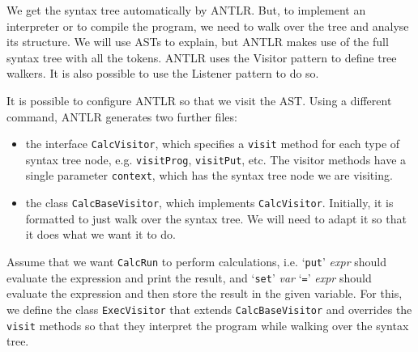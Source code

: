 \documentclass[a4paper, openany]{memoir}
\begin{document}
We get the syntax tree automatically by ANTLR. But, to implement an interpreter or to compile the program, we need to walk over the tree and analyse its structure. We will use ASTs to explain, but ANTLR makes use of the full syntax tree with all the tokens. ANTLR uses the Visitor pattern to define tree walkers. It is also possible to use the Listener pattern to do so.

It is possible to configure ANTLR so that we visit the AST. Using a different command, ANTLR generates two further files:
\begin{itemize}
    \item the interface \texttt{CalcVisitor}, which specifies a \texttt{visit} method for each type of syntax tree node, e.g. \texttt{visitProg}, \texttt{visitPut}, etc. The visitor methods have a single parameter \texttt{context}, which has the syntax tree node we are visiting.
    \item the class \texttt{CalcBaseVisitor}, which implements \texttt{CalcVisitor}. Initially, it is formatted to just walk over the syntax tree. We will need to adapt it so that it does what we want it to do.
\end{itemize}

Assume that we want \texttt{CalcRun} to perform calculations, i.e. `\texttt{put}' \textit{expr} should evaluate the expression and print the result, and `\texttt{set}' \textit{var} `\texttt{=}' \textit{expr} should evaluate the expression and then store the result in the given variable. For this, we define the class \texttt{ExecVisitor} that extends \texttt{CalcBaseVisitor} and overrides the \texttt{visit} methods so that they interpret the program while walking over the syntax tree.
\end{document}
